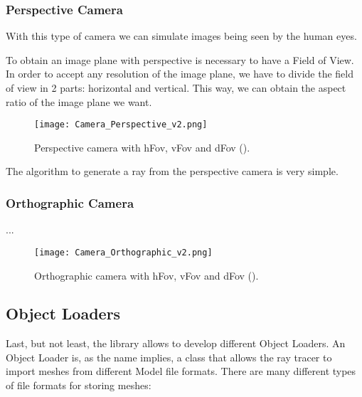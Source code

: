 \subsubsection{Perspective Camera}

\par
With this type of camera we can simulate images being seen by the human eyes.

\par
To obtain an image plane with perspective is necessary to have a Field of View.
In order to accept any resolution of the image plane, we have to divide the field of view in 2 parts: horizontal and vertical.
This way, we can obtain the aspect ratio of the image plane we want.

\begin{figure}[H]
	\centering
	\caption{Perspective camera with hFov, vFov and dFov (\cite{Camera_Perspective_Orthographic}).}
	\label{Perspective_Camera.}
	\texttt{[image: Camera\_Perspective\_v2.png]}
\end{figure}

\par
The algorithm to generate a ray from the perspective camera is very simple.



\subsubsection{Orthographic Camera}

\par
...

\begin{figure}[H]
	\centering
	\caption{Orthographic camera with hFov, vFov and dFov (\cite{Camera_Perspective_Orthographic}).}
	\label{Perspective_Camera.}
	\texttt{[image: Camera\_Orthographic\_v2.png]}
\end{figure}


\subsection{Object Loaders}

\par
Last, but not least, the library allows to develop different Object Loaders.
An Object Loader is, as the name implies, a class that allows the ray tracer to import meshes from different Model file formats.
There are many different types of file formats for storing meshes:

